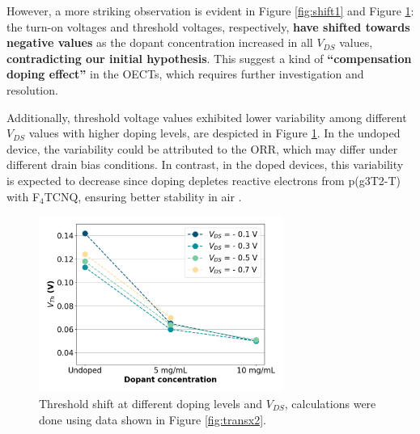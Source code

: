 
However, a more striking observation is evident in Figure \ref{fig:shift1} and Figure \ref{fig:vth_vds}: the turn-on voltages and threshold voltages, respectively, \textbf{have shifted towards negative values} as the dopant concentration increased in all $V_{DS}$ values, \textbf{contradicting our initial hypothesis}. This suggest a kind of \textbf{``compensation doping effect''} in the OECTs, which requires further investigation and resolution. %

Additionally, threshold voltage values exhibited lower variability among different $V_{DS}$ values with higher doping levels, are despicted in Figure \ref{fig:vth_vds}. In the undoped device, the variability could be attributed to the ORR, which may differ under different drain bias conditions. In contrast, in the doped devices, this variability is expected to decrease since doping depletes reactive electrons from p(g3T2-T) with F$_{4}$TCNQ, ensuring better stability in air \cite{tanTuningOrganicElectrochemical2022}. %

\begin{figure}[ht]
  \centering
  \includegraphics[width=8cm]{Images/pdf/vth_shift_vds.pdf}
  \caption[Threshold shift at different doping levels and $V_{DS}$]{Threshold shift at different doping levels and $V_{DS}$, calculations were done using data shown in Figure \ref{fig:transx2}.}
  \label{fig:vth_vds}
\end{figure}

